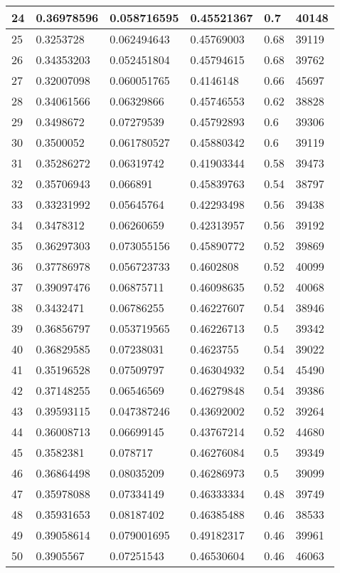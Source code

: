 \begin{longtable}{|l|l|l|l|l|l|}
24 & 0.36978596 & 0.058716595 & 0.45521367 & 0.7 & 40148 \\ \hline 
25 & 0.3253728 & 0.062494643 & 0.45769003 & 0.68 & 39119 \\ \hline 
26 & 0.34353203 & 0.052451804 & 0.45794615 & 0.68 & 39762 \\ \hline 
27 & 0.32007098 & 0.060051765 & 0.4146148 & 0.66 & 45697 \\ \hline 
28 & 0.34061566 & 0.06329866 & 0.45746553 & 0.62 & 38828 \\ \hline 
29 & 0.3498672 & 0.07279539 & 0.45792893 & 0.6 & 39306 \\ \hline 
30 & 0.3500052 & 0.061780527 & 0.45880342 & 0.6 & 39119 \\ \hline 
31 & 0.35286272 & 0.06319742 & 0.41903344 & 0.58 & 39473 \\ \hline 
32 & 0.35706943 & 0.066891 & 0.45839763 & 0.54 & 38797 \\ \hline 
33 & 0.33231992 & 0.05645764 & 0.42293498 & 0.56 & 39438 \\ \hline 
34 & 0.3478312 & 0.06260659 & 0.42313957 & 0.56 & 39192 \\ \hline 
35 & 0.36297303 & 0.073055156 & 0.45890772 & 0.52 & 39869 \\ \hline 
36 & 0.37786978 & 0.056723733 & 0.4602808 & 0.52 & 40099 \\ \hline 
37 & 0.39097476 & 0.06875711 & 0.46098635 & 0.52 & 40068 \\ \hline 
38 & 0.3432471 & 0.06786255 & 0.46227607 & 0.54 & 38946 \\ \hline 
39 & 0.36856797 & 0.053719565 & 0.46226713 & 0.5 & 39342 \\ \hline 
40 & 0.36829585 & 0.07238031 & 0.4623755 & 0.54 & 39022 \\ \hline 
41 & 0.35196528 & 0.07509797 & 0.46304932 & 0.54 & 45490 \\ \hline 
42 & 0.37148255 & 0.06546569 & 0.46279848 & 0.54 & 39386 \\ \hline 
43 & 0.39593115 & 0.047387246 & 0.43692002 & 0.52 & 39264 \\ \hline 
44 & 0.36008713 & 0.06699145 & 0.43767214 & 0.52 & 44680 \\ \hline 
45 & 0.3582381 & 0.078717 & 0.46276084 & 0.5 & 39349 \\ \hline 
46 & 0.36864498 & 0.08035209 & 0.46286973 & 0.5 & 39099 \\ \hline 
47 & 0.35978088 & 0.07334149 & 0.46333334 & 0.48 & 39749 \\ \hline 
48 & 0.35931653 & 0.08187402 & 0.46385488 & 0.46 & 38533 \\ \hline 
49 & 0.39058614 & 0.079001695 & 0.49182317 & 0.46 & 39961 \\ \hline 
50 & 0.3905567 & 0.07251543 & 0.46530604 & 0.46 & 46063 \\ \hline 
\end{longtable}